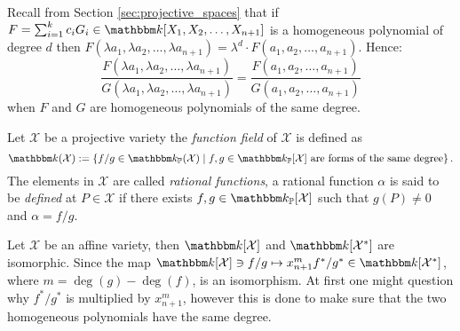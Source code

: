 \newpage
Recall from Section \ref{sec:projective_spaces} that if $F = \sum^{k}_{i = 1} c_{i} G_{i} \in \K[X_1, X_2, \ldots, X_{n + 1}]$ is a homogeneous polynomial of degree $d$ then $F(\lambda a_1, \lambda a_2, \ldots, \lambda a_{n + 1}) = \lambda^d \cdot F(a_1, a_2, \ldots, a_{n + 1})$. Hence:
\begin{equation*}
\frac{F(\lambda a_1, \lambda a_2, \ldots, \lambda a_{n + 1})}{G(\lambda a_1, \lambda a_2, \ldots, \lambda a_{n + 1})} = \frac{F(a_1, a_2, \ldots, a_{n + 1})}{G(a_1, a_2, \ldots, a_{n + 1})}
\end{equation*}
when $F$ and $G$ are homogeneous polynomials of the same degree.
\begin{definition}
  Let $\mathcal{X}$ be a projective variety the \textit{function field} of $\mathcal{X}$ is defined as
\begin{equation*}
  \K(\mathcal{X}) := \left\{f / g \in \K_{\mathbb{P}}(\mathcal{X}) \mid f, g \in \K_{\mathbb{P}}[\mathcal{X}] \text{ are forms of the same degree} \right\}.
\end{equation*}
The elements in $\mathcal{X}$ are called \textit{rational functions}, a rational function $\alpha$ is said to be \textit{ defined} at $P \in \mathcal{X}$ if there exists $f, g \in \K_{\mathbb{P}}[\mathcal{X}]$ such that $g(P) \neq 0$ and $\alpha = f / g$.
\end{definition}
\begin{remark}\label{rem:function_fields_are_iso}
  Let $\mathcal{X}$ be an affine variety, then $\K[\mathcal{X}]$ and $\K[\mathcal{X}^{*}]$ are isomorphic. Since the map $\K[\mathcal{X}] \ni f/g \mapsto x_{n+1}^{m} f^{*} / g^{*} \in \K[\mathcal{X}^{*}]$, where $m = \deg(g) - \deg(f)$, is an isomorphism. At first one might question why $f^{*} / g^{*}$ is multiplied by $x_{n + 1}^{m}$, however this is done to make sure that the two homogeneous polynomials have the same degree.
\end{remark}
